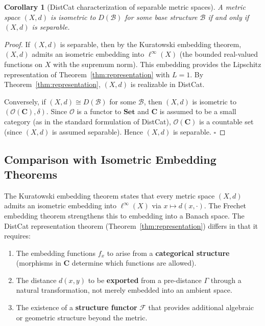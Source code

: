 \documentclass[11pt,a4paper]{article}
\newtheorem{corollary}[theorem]{Corollary}
\begin{document}
\begin{corollary}[DistCat characterization of separable metric spaces]\label{cor:characterization}
A metric space $(X,d)$ is isometric to $D(\mathcal{B})$ for some base structure
$\mathcal{B}$ if and only if $(X,d)$ is separable.
\end{corollary}

\begin{proof}
If $(X,d)$ is separable, then by the Kuratowski embedding theorem, $(X,d)$
admits an isometric embedding into $\ell^\infty(X)$ (the bounded
real-valued functions on $X$ with the supremum norm). This embedding
provides the Lipschitz representation of Theorem~\ref{thm:representation}
with $L=1$. By Theorem~\ref{thm:representation}, $(X,d)$ is realizable in
DistCat.

Conversely, if $(X,d)\cong D(\mathcal{B})$ for some $\mathcal{B}$, then
$(X,d)$ is isometric to $(\mathcal{O}(\mathbf{C}),\delta)$. Since $\mathcal{O}$
is a functor to $\mathbf{Set}$ and $\mathbf{C}$ is assumed to be a small
category (as in the standard formulation of DistCat), $\mathcal{O}(\mathbf{C})$
is a countable set (since $(X,d)$ is assumed separable). Hence $(X,d)$ is
separable. $\square$
\end{proof}

\subsection{Comparison with Isometric Embedding Theorems}

The Kuratowski embedding theorem states that every metric space $(X,d)$
admits an isometric embedding into $\ell^\infty(X)$ via $x\mapsto d(x,\cdot)$.
The Frechet embedding theorem strengthens this to embedding into a Banach
space. The DistCat representation theorem (Theorem~\ref{thm:representation})
differs in that it requires:

\begin{enumerate}
\item The embedding functions $f_x$ to arise from a \textbf{categorical
structure} (morphisms in $\mathbf{C}$ determine which functions are allowed).
\item The distance $d(x,y)$ to be \textbf{exported} from a pre-distance
$\Gamma$ through a natural transformation, not merely embedded into an
ambient space.
\item The existence of a \textbf{structure functor} $\mathcal{F}$ that
provides additional algebraic or geometric structure beyond the metric.
\end{enumerate}
\end{document}
